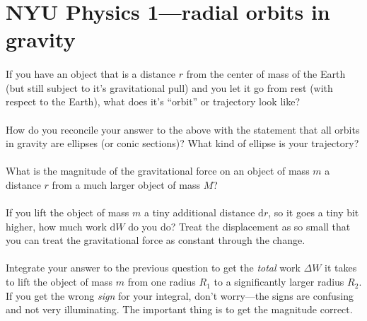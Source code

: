 \documentclass[12pt]{article}
\newcommand{\dd}{\mathrm{d}}
\newcounter{problem}
\begin{document}
\sloppy\sloppypar\raggedbottom\frenchspacing\thispagestyle{empty}

\section*{NYU Physics 1---radial orbits in gravity}

\paragraph{\theproblem}%
If you have an object that is a distance $r$ from the center of mass
of the Earth (but still subject to it's gravitational pull) and you
let it go from rest (with respect to the Earth), what does it's
``orbit'' or trajectory look like?

\paragraph{\theproblem}%
How do you reconcile your answer to the above with the statement that
all orbits in gravity are ellipses (or conic sections)?  What kind of
ellipse is your trajectory?

\paragraph{\theproblem}%
What is the magnitude of the gravitational force on an object of mass
$m$ a distance $r$ from a much larger object of mass $M$?

\paragraph{\theproblem}%
If you lift the object of mass $m$ a tiny additional distance $\dd r$,
so it goes a tiny bit higher, how much work $\dd W$ do you do?
Treat the displacement as so small that you can treat the
gravitational force as constant through the change.

\paragraph{\theproblem}%
Integrate your answer to the previous question to get the \emph{total}
work $\Delta W$ it takes to lift the object of mass $m$ from one
radius $R_1$ to a significantly larger radius $R_2$.  If you get the
wrong \emph{sign} for your integral, don't worry---the signs are
confusing and not very illuminating.  The important thing is to get
the magnitude correct.
\end{document}

